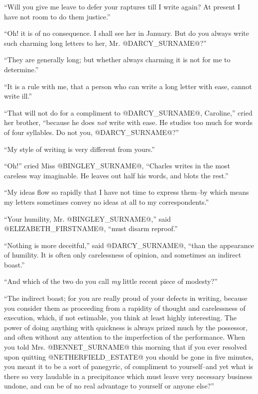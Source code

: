 ``Will you give me leave to defer your raptures till I write again? At
present I have not room to do them justice.''

``Oh! it is of no consequence. I shall see her in January. But do you
always write such charming long letters to her, Mr. @DARCY_SURNAME@?''

``They are generally long; but whether always charming it is not for me
to determine.''

``It is a rule with me, that a person who can write a long letter with
ease, cannot write ill.''

``That will not do for a compliment to @DARCY_SURNAME@, Caroline,'' cried her
brother, ``because he does \textit{not} write with ease. He studies too much for
words of four syllables. Do not you, @DARCY_SURNAME@?''

``My style of writing is very different from yours.''

``Oh!'' cried Miss @BINGLEY_SURNAME@, ``Charles writes in the most careless way
imaginable. He leaves out half his words, and blots the rest.''

``My ideas flow so rapidly that I have not time to express them--by which
means my letters sometimes convey no ideas at all to my correspondents.''

``Your humility, Mr. @BINGLEY_SURNAME@,'' said @ELIZABETH_FIRSTNAME@, ``must disarm reproof.''

``Nothing is more deceitful,'' said @DARCY_SURNAME@, ``than the appearance of
humility. It is often only carelessness of opinion, and sometimes an
indirect boast.''

``And which of the two do you call \textit{my} little recent piece of modesty?''

``The indirect boast; for you are really proud of your defects in
writing, because you consider them as proceeding from a rapidity of
thought and carelessness of execution, which, if not estimable, you
think at least highly interesting. The power of doing anything with
quickness is always prized much by the possessor, and often without any
attention to the imperfection of the performance. When you told Mrs.
@BENNET_SURNAME@ this morning that if you ever resolved upon quitting @NETHERFIELD_ESTATE@
you should be gone in five minutes, you meant it to be a sort of
panegyric, of compliment to yourself--and yet what is there so very
laudable in a precipitance which must leave very necessary business
undone, and can be of no real advantage to yourself or anyone else?''

